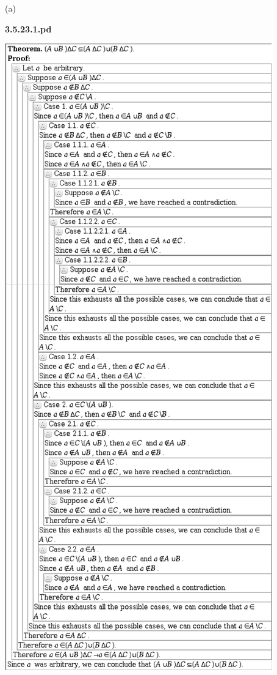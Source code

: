 \documentclass{article}
\begin{document}
\vspace{30pt}

(a)

\textbf{3.5.23.1.pd}
\vspace{10pt}

\includegraphics[scale=0.15]{3_5_23_1}
\end{document}
